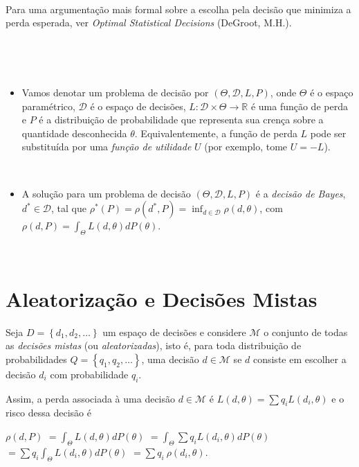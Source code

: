 \documentclass[
]{book}
\providecommand{\tightlist}{%
  \setlength{\itemsep}{0pt}\setlength{\parskip}{0pt}}
\begin{document}
\(~\)

Para uma argumentação mais formal sobre a escolha pela decisão que minimiza a perda esperada, ver \emph{Optimal Statistical Decisions} (DeGroot, M.H.).

\(~\)

\(~\)

\begin{itemize}
\tightlist
\item
  Vamos denotar um problema de decisão por \(\left(\Theta, \mathcal{D}, L, P\right)\), onde \(\Theta\) é o espaço paramétrico, \(\mathcal{D}\) é o espaço de decisões, \(L: \mathcal{D} \times \Theta \longrightarrow \mathbb{R}\) é uma função de perda e \(P\) é a distribuição de probabilidade que representa sua crença sobre a quantidade desconhecida \(\theta\). Equivalentemente, a função de perda \(L\) pode ser substituída por uma \emph{função de utilidade} \(U\) (por exemplo, tome \(U=-L\)).
\end{itemize}

\(~\)

\begin{itemize}
\tightlist
\item
  A solução para um problema de decisão \(\left(\Theta, \mathcal{D}, L, P\right)\) é a \emph{decisão de Bayes}, \({d}^* \in \mathcal{D}\), tal que \(\rho^*(P) = \rho({d}^*,P) = \displaystyle \inf_{d \in \mathcal{D}} \rho(d,\theta)\), com \(\rho(d,P) = \displaystyle \int_\Theta L(d,\theta)dP(\theta)\).
\end{itemize}

\(~\)

\hypertarget{aleatorizauxe7uxe3o-e-decisuxf5es-mistas}{%
\section{Aleatorização e Decisões Mistas}\label{aleatorizauxe7uxe3o-e-decisuxf5es-mistas}}

Seja \(D=\left\{d_1,d_2,\ldots\right\}\) um espaço de decisões e considere \(\mathcal{M}\) o conjunto de todas as \emph{decisões mistas} (ou \emph{aleatorizadas}), isto é, para toda distribuição de probabilidades \(Q=\left\{q_1,q_2,\ldots\right\}\), uma decisão \(d\in\mathcal{M}\) se \(d\) consiste em escolher a decisão \(d_i\) com probabilidade \(q_i\).

Assim, a perda associada à uma decisão \(d\in\mathcal{M}\) é \(L(d,\theta) = \sum q_i L(d_i,\theta)\) e o risco dessa decisão é

\(\rho(d,P)\) \(= \displaystyle \int_\Theta L(d,\theta) dP(\theta)\) \(=\displaystyle \int_\Theta \sum q_i L(d_i,\theta) dP(\theta)\) \(=\displaystyle \sum q_i \int_\Theta L(d_i,\theta) dP(\theta)\) \(=\displaystyle \sum q_i~ \rho(d_i,\theta)\).
\end{document}
